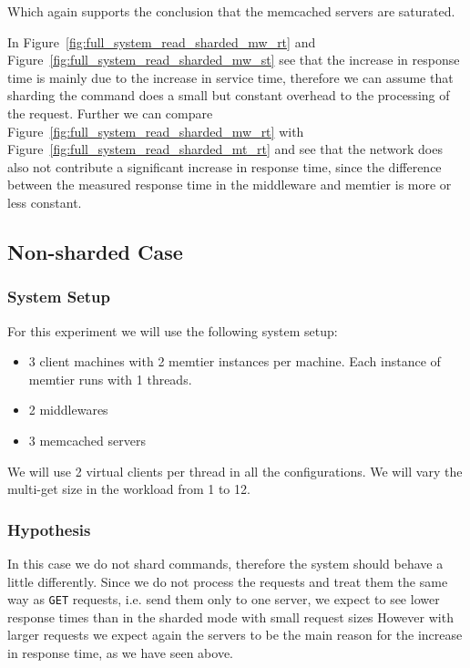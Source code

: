 \documentclass[11pt,a4paper]{article}
\begin{document}
%
Which again supports the conclusion that the memcached servers are saturated.
%
\par
%
In Figure~\ref{fig:full_system_read_sharded_mw_rt} and Figure~\ref{fig:full_system_read_sharded_mw_st} see that the increase in response time is mainly due to the increase in service time, therefore we can assume that sharding the command does a small but constant overhead to the processing of the request.
%
Further we can compare Figure~\ref{fig:full_system_read_sharded_mw_rt} with Figure~\ref{fig:full_system_read_sharded_mt_rt} and see that the network does also not contribute a significant increase in response time, since the difference between the measured response time in the middleware and memtier is more or less constant.
%
\subsection{Non-sharded Case}
%
\subsubsection{System Setup}
%
For this experiment we will use the following system setup:
%
\begin{itemize}
	\item 3 client machines with 2 memtier instances per machine. Each instance of memtier runs with 1 threads.
	\item 2 middlewares
	\item 3 memcached servers
\end{itemize}
%
We will use 2 virtual clients per thread in all the configurations.
%
We will vary the multi-get size in the workload from 1 to 12.
%
\subsubsection{Hypothesis}
%
In this case we do not shard commands, therefore the system should behave a little differently.
%
Since we do not process the requests and treat them the same way as \texttt{GET} requests, i.e. send them only to one server, we expect to see lower response times than in the sharded mode with small request sizes
%
However with larger requests we expect again the servers to be the main reason for the increase in response time, as we have seen above.
%
\end{document}
